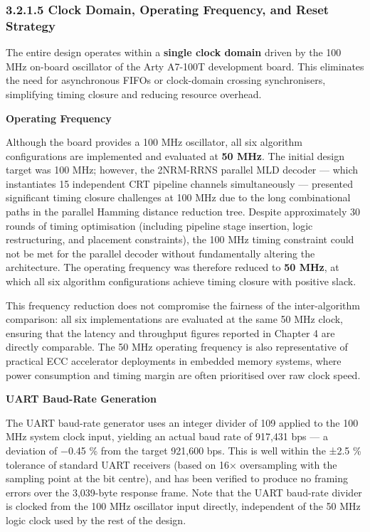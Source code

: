 \documentclass[
  english,
  12pt,
]{report}
\begin{document}
\subsubsection{3.2.1.5 Clock Domain, Operating Frequency, and Reset
Strategy}\label{clock-domain-operating-frequency-and-reset-strategy}

The entire design operates within a \textbf{single clock domain} driven
by the 100 MHz on-board oscillator of the Arty A7-100T development
board. This eliminates the need for asynchronous FIFOs or clock-domain
crossing synchronisers, simplifying timing closure and reducing resource
overhead.

\textbf{Operating Frequency}

Although the board provides a 100 MHz oscillator, all six algorithm
configurations are implemented and evaluated at \textbf{50 MHz}. The
initial design target was 100 MHz; however, the 2NRM-RRNS parallel MLD
decoder --- which instantiates 15 independent CRT pipeline channels
simultaneously --- presented significant timing closure challenges at
100 MHz due to the long combinational paths in the parallel Hamming
distance reduction tree. Despite approximately 30 rounds of timing
optimisation (including pipeline stage insertion, logic restructuring,
and placement constraints), the 100 MHz timing constraint could not be
met for the parallel decoder without fundamentally altering the
architecture. The operating frequency was therefore reduced to
\textbf{50 MHz}, at which all six algorithm configurations achieve
timing closure with positive slack.

This frequency reduction does not compromise the fairness of the
inter-algorithm comparison: all six implementations are evaluated at the
same 50 MHz clock, ensuring that the latency and throughput figures
reported in Chapter 4 are directly comparable. The 50 MHz operating
frequency is also representative of practical ECC accelerator
deployments in embedded memory systems, where power consumption and
timing margin are often prioritised over raw clock speed.

\textbf{UART Baud-Rate Generation}

The UART baud-rate generator uses an integer divider of 109 applied to
the 100 MHz system clock input, yielding an actual baud rate of 917,431
bps --- a deviation of −0.45 \% from the target 921,600 bps. This is
well within the ±2.5 \% tolerance of standard UART receivers (based on
16× oversampling with the sampling point at the bit centre), and has
been verified to produce no framing errors over the 3,039-byte response
frame. Note that the UART baud-rate divider is clocked from the 100 MHz
oscillator input directly, independent of the 50 MHz logic clock used by
the rest of the design.
\end{document}
